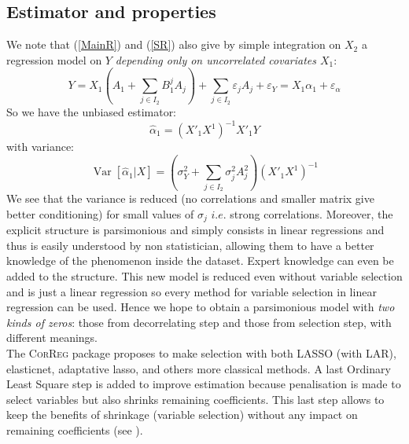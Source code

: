 \documentclass[11pt,a4paper]{article}
\begin{document}
\subsection{Estimator and properties}
	We note that (\ref{MainR}) and (\ref{SR}) also give by simple integration on $X_2$ a regression model on $Y$ {\it depending only on uncorrelated covariates $X_1$}:
	\begin{equation}
		Y=X_1 (A_{1}+ \sum_{j \in I_2}B^{j}_{1}A_{j})+  \sum_{j \in I_2}\varepsilon_{j}A_{j}+\varepsilon_Y 
		 = X_1\alpha_1+ \varepsilon_{\alpha}\label{Trueexpl}
	\end{equation}			
		So we have the unbiased estimator: 
		\begin{equation}
			\hat{\alpha}_{1} = (X'_{1} X^{1})^{-1}X'_{1}Y %
		\end{equation}
		with variance:
		\begin{equation}
			\operatorname{Var}[\hat{\alpha}_{1}|X]= (\sigma^2_Y+\sum_{j \in I_2}\sigma^2_{j}A_{j}^2 )(X'_{1} X^{1})^{-1} %
		\end{equation}
		We see that the variance is reduced (no correlations and smaller matrix give better conditioning) for small values of $\sigma_j$ $i.e.$ strong correlations.					
			Moreover, the explicit structure is parsimonious and simply consists in linear regressions and thus is easily understood by non statistician, allowing them to have a better knowledge of the phenomenon inside the dataset. Expert knowledge can even be added to the structure.
			 This new model is reduced even without variable selection and is just a linear regression so every method for variable selection in linear regression can be used. Hence we hope to obtain a parsimonious model with { \it two kinds of zeros}: those from decorrelating step and those from selection step, with different meanings.
			 \\
			 The \textsc{CorReg} package proposes to make selection with both LASSO (with LAR), elasticnet, adaptative lasso, and others more classical methods. A last Ordinary Least Square step is added to improve estimation because penalisation is made to select variables but also shrinks remaining coefficients. This last step allows to keep the benefits of shrinkage (variable selection) without any impact on remaining coefficients (see \cite{SAM10088}).
		 
\end{document}
